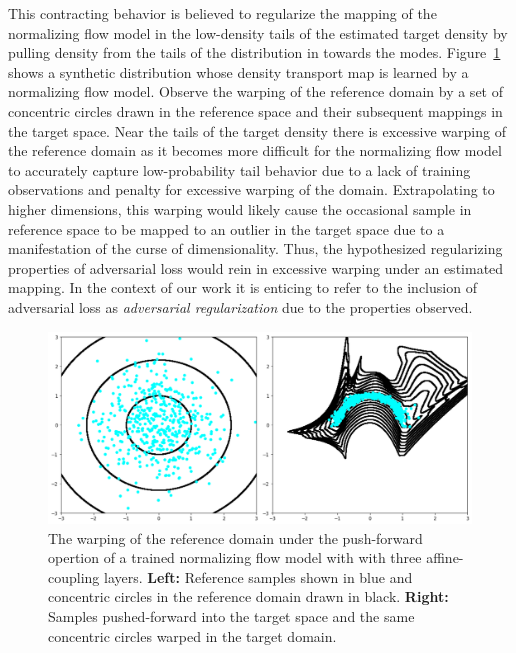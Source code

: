 This contracting behavior is believed to regularize the mapping of the normalizing flow model in the low-density tails
of the estimated target density by pulling density from the tails of the distribution in towards the modes.
Figure~\ref{fig:flow_circs} shows a synthetic distribution whose density transport map is learned by a normalizing flow model.
Observe the warping of the reference domain by a set of concentric circles drawn in the reference space and their
subsequent mappings in the target space.
Near the tails of the target density there is excessive warping of the reference domain as it becomes more
difficult for the normalizing flow model to accurately capture low-probability tail behavior due to a lack of training
observations and penalty for excessive warping of the domain.
Extrapolating to higher dimensions, this warping would likely cause the occasional sample in reference space to be
mapped to an outlier in the target space due to a manifestation of the curse of dimensionality.
Thus, the hypothesized regularizing properties of adversarial loss would rein in excessive warping under an
estimated mapping.
In the context of our work it is enticing to refer to the inclusion of adversarial loss as \textit{adversarial
regularization} due to the properties observed.

\begin{figure}[htbp]
    \caption[Illustration of domain warping for synthetic 2-d distribution]{
        The warping of the reference domain under the push-forward opertion of a trained normalizing flow model with
        with three affine-coupling layers.
        \textbf{Left:} Reference samples shown in blue and concentric circles in the reference domain
        drawn in black.
        \textbf{Right:} Samples pushed-forward into the target space and the same concentric circles
        warped in the target domain.
    }
    \begin{center}
        \setlength{\fboxsep}{0pt}%
        \setlength{\fboxrule}{1pt}%
        \includegraphics[width=120mm]{figs/nf_circs_cropped}
    \end{center}
    \label{fig:flow_circs}
\end{figure}

